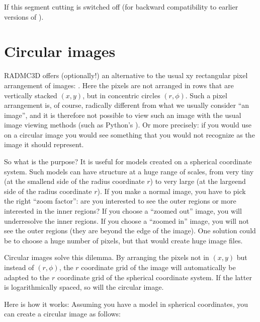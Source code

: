 \documentclass[letterpaper,10pt,english]{sphinxmanual}
\begin{document}
If  this segment cutting is switched off (for
backward compatibility to earlier versions of ).


\section{Circular images}
\label{\detokenize{imagesspectra:circular-images}}\label{\detokenize{imagesspectra:sec-circularimages}}
RADMC\sphinxhyphen{}3D offers (optionally!) an alternative to the usual x\sphinxhyphen{}y rectangular pixel
arrangement of images: . Here the pixels are not arranged in
rows that are vertically stacked \((x,y)\), but in concentric circles
\((r,\phi)\). Such a pixel arrangement is, of course, radically different
from what we usually consider “an image”, and it is therefore not possible to
view such an image with the usual image viewing methods (such as Python’s
). Or more precisely: if you would use 
on a circular image you would see something that you would not recognize
as the image it should represent.

So what is the purpose? It is useful for models created on a spherical
coordinate system. Such models can have structure at a huge range of scales,
from very tiny (at the small\sphinxhyphen{}end side of the radius coordinate \(r\))
to very large (at the large\sphinxhyphen{}end side of the radius coordinate \(r\)).
If you make a normal image, you have to pick the right “zoom factor”: are
you interested to see the outer regions or more interested in the inner
regions? If you choose a “zoomed out” image, you will under\sphinxhyphen{}resolve
the inner regions. If you choose a “zoomed in” image, you will not see
the outer regions (they are beyond the edge of the image). One solution
could be to choose a huge number of pixels, but that would create huge
image files.

Circular images solve this dilemma. By arranging the pixels not in \((x,y)\)
but instead of \((r,\phi)\), the \(r\) coordinate grid of the image will
automatically be adapted to the \(r\) coordinate grid of the spherical
coordinate system. If the latter is logarithmically spaced, so will the circular
image.

Here is how it works: Assuming you have a model in spherical coordinates,
you can create a circular image as follows:
\end{document}
